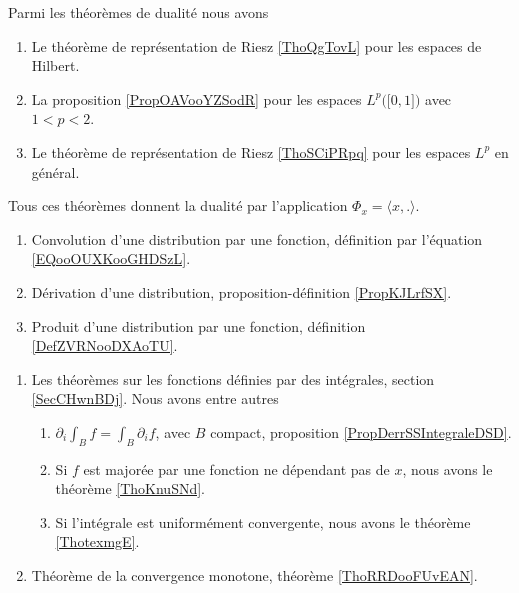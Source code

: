 Parmi les théorèmes de dualité nous avons
\begin{enumerate}
    \item
        Le théorème de représentation de Riesz \ref{ThoQgTovL} pour les espaces de Hilbert.
    \item
        La proposition \ref{PropOAVooYZSodR} pour les espaces \( L^p\big( \mathopen[ 0 , 1 \mathclose] \big)\) avec \( 1<p<2\).
    \item
        Le théorème de représentation de Riesz \ref{ThoSCiPRpq} pour les espaces \( L^p\) en général.
\end{enumerate}
Tous ces théorèmes donnent la dualité par l'application \( \Phi_x=\langle x, .\rangle \).

\begin{enumerate}
    \item
        Convolution d'une distribution par une fonction, définition par l'équation \eqref{EQooOUXKooGHDSzL}.
    \item
        Dérivation d'une distribution, proposition-définition \ref{PropKJLrfSX}.
    \item
        Produit d'une distribution par une fonction, définition \ref{DefZVRNooDXAoTU}.
\end{enumerate}

\begin{enumerate}
    \item 
        Les théorèmes sur les fonctions définies par des intégrales, section \ref{SecCHwnBDj}. Nous avons entre autres
        \begin{enumerate}
            \item
                \( \partial_i\int_Bf=\int_B\partial_if\), avec \( B\) compact, proposition \ref{PropDerrSSIntegraleDSD}.
            \item
                Si \( f\) est majorée par une fonction ne dépendant pas de \( x\), nous avons le théorème \ref{ThoKnuSNd}.
            \item
                Si l'intégrale est uniformément convergente, nous avons le théorème \ref{ThotexmgE}.
        \end{enumerate}
    \item 
        Théorème de la convergence monotone, théorème \ref{ThoRRDooFUvEAN}.
\end{enumerate}

